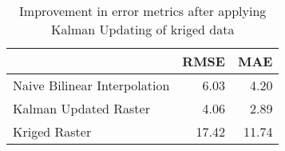 \begin{table}
\centering
\caption{Improvement in error metrics after applying Kalman Updating of kriged data}
\label{tab:oahu2_gebco_raster_error}
\begin{tabular}{lrr}
\toprule
 & RMSE & MAE \\
\midrule
Naive Bilinear Interpolation & 6.03 & 4.20 \\
Kalman Updated Raster & 4.06 & 2.89 \\
Kriged Raster & 17.42 & 11.74 \\
\bottomrule
\end{tabular}
\end{table}
